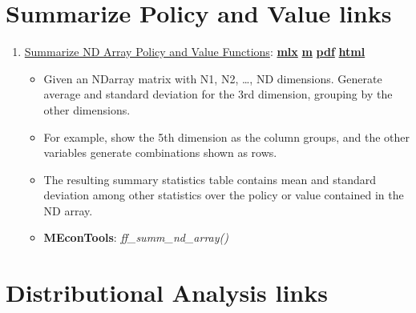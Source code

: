 \documentclass[
]{book}
\providecommand{\tightlist}{%
  \setlength{\itemsep}{0pt}\setlength{\parskip}{0pt}}
\begin{document}
\hypertarget{summarize-policy-and-value-links}{%
\section{Summarize Policy and Value links}\label{summarize-policy-and-value-links}}

\begin{enumerate}
\def\labelenumi{\arabic{enumi}.}
\tightlist
\item
  \href{https://fanwangecon.github.io/MEconTools/MEconTools/doc/summ/htmlpdfm/fx_summ_nd_array.html}{Summarize ND Array Policy and Value Functions}: \href{https://github.com/FanWangEcon/MEconTools/blob/master/MEconTools/doc/summ/fx_summ_nd_array.mlx}{\textbf{mlx}} \textbar{} \href{https://github.com/FanWangEcon/MEconTools/blob/master/MEconTools/doc/summ/htmlpdfm/fx_summ_nd_array.m}{\textbf{m}} \textbar{} \href{https://github.com/FanWangEcon/MEconTools/blob/master/MEconTools/doc/summ/htmlpdfm/fx_summ_nd_array.pdf}{\textbf{pdf}} \textbar{} \href{https://fanwangecon.github.io/MEconTools/MEconTools/doc/summ/htmlpdfm/fx_summ_nd_array.html}{\textbf{html}}

  \begin{itemize}
  \tightlist
  \item
    Given an NDarray matrix with N1, N2, \ldots, ND dimensions. Generate average and standard deviation for the 3rd dimension, grouping by the other dimensions.
  \item
    For example, show the 5th dimension as the column groups, and the other variables generate combinations shown as rows.
  \item
    The resulting summary statistics table contains mean and standard deviation among other statistics over the policy or value contained in the ND array.
  \item
    \textbf{MEconTools}: \emph{ff\_summ\_nd\_array()}
  \end{itemize}
\end{enumerate}

\hypertarget{distributional-analysis-links}{%
\section{Distributional Analysis links}\label{distributional-analysis-links}}
\end{document}
